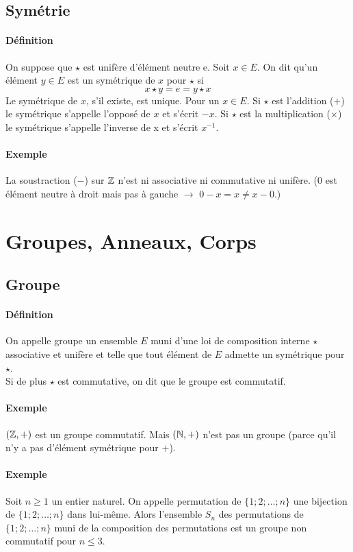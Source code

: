 %
\subsection{Symétrie}
%
\paragraph{Définition} On suppose que $\star$ est unifère d'élément neutre e. Soit $x \in E$. On dit qu'un élément $y \in E$ est un symétrique de $x$ pour $\star$ si
$$ x \star y = e = y \star x$$
Le symétrique de $x$, s'il existe, est unique. Pour un $x \in E$. Si $\star$ est l'addition ($+$) le symétrique s'appelle l'opposé de $x$ et s'écrit $-x$. Si $\star$ est la multiplication ($\times$) le symétrique s'appelle l'inverse de x et s'écrit $x^{-1}$.
 
\paragraph{Exemple} La soustraction ($-$) sur $\mathbb{Z}$ n'est ni associative ni commutative ni unifère. ($0$ est élément neutre à droit mais pas à gauche $\rightarrow$ $0 - x = x \neq x - 0$.)

%
%
\section{Groupes, Anneaux, Corps}
%
%
%
\subsection{Groupe}
%
\paragraph{Définition} On appelle groupe un ensemble $E$ muni d'une loi de composition interne $\star$ associative et unifère et telle que tout élément de $E$ admette un symétrique pour $\star$. \\
Si de plus $\star$ est commutative, on dit que le groupe est commutatif.

\paragraph{Exemple}
$(\mathbb{Z}, +)$ est un groupe commutatif. Mais $(\mathbb{N}, +)$ n'est pas un groupe (parce qu'il n'y a pas d'élément symétrique pour $+$).

\paragraph{Exemple} Soit $n \geq 1$ un entier naturel. On appelle permutation de $\{ 1; 2; \ldots ; n\}$ une bijection de $\{ 1; 2; \ldots ; n\}$ dans lui-même. Alors l'ensemble $S_n$ des permutations de $\{ 1; 2; \ldots ; n\}$ muni de la composition des permutations est un groupe non commutatif pour $n \leq 3$.

